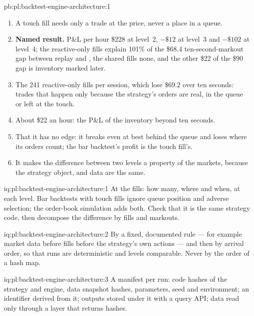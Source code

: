 \begin{solution}{pb:pl:backtest-engine-architecture:1}
\begin{enumerate}
\item A touch fill needs only a trade at the price, never a place in a queue.
\item \textbf{Named result.} P\&L per hour \$228 at level~2, $-\$12$ at level~3 and $-\$102$ at level~4; the reactive-only fills explain 101\%
of the \$68.4 ten-second-markout gap between replay and , the shared fills none, and the other \$22 of the \$90 gap is
inventory marked later.
\item The 241 reactive-only fills per session, which lose \$69.2 over ten seconds: trades that happen only because the strategy's orders are
real, in the queue or left at the touch.
\item About \$22 an hour: the P\&L of the inventory beyond ten seconds.
\item That it has no edge: it breaks even at best behind the queue and loses where its orders count; the bar backtest's profit is the touch
fill's.
\item It makes the difference between two levels a property of the markets, because the strategy object,  and data are the same.
\end{enumerate}
\end{solution}

\begin{solution}{iq:pl:backtest-engine-architecture:1}
At the fills: how many, where and when, at each level. Bar backtests with touch fills ignore queue position and adverse selection; the
order-book simulation adds both. Check that it is the same strategy code, then decompose the difference by fills and markouts.
\end{solution}

\begin{solution}{iq:pl:backtest-engine-architecture:2}
By a fixed, documented rule --- for example market data before fills before the strategy's own actions --- and then by arrival order, so
that runs are deterministic and levels comparable. Never by the order of a hash map.
\end{solution}

\begin{solution}{iq:pl:backtest-engine-architecture:3}
A manifest per run: code hashes of the strategy and engine, data snapshot hashes, parameters, seed and environment; an identifier derived from
it; outputs stored under it with a query API; data read only through a layer that returns hashes.
\end{solution}

